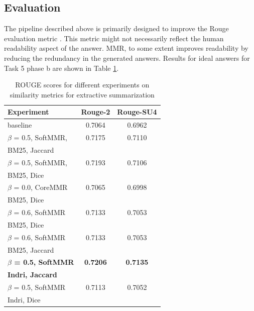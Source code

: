 \documentclass[11pt,a4paper]{article}
\begin{document}
\subsection{\textbf{Evaluation}} The pipeline described above is primarily designed to improve the Rouge evaluation metric \cite{Rougue}. This metric might not necessarily reflect the human readability aspect of the answer. MMR, to some extent improves readability by reducing the redundancy in the generated answers.
Results for ideal answers for Task 5 phase b are shown in Table \ref{tab:rouge_extractive_summarization}.

\begin{table}[t!]
    \centering
    \begin{tabular}{|l|c|c|}
         \hline
            Experiment & Rouge-2 & Rouge-SU4 \\
        \hline
        \hline
        baseline & 0.7064 & 0.6962 \\
        \hline
        $\beta$ = 0.5, SoftMMR,  & 0.7175 & 0.7110  \\ 
        BM25, Jaccard&&\\
        \hline
        $\beta$ = 0.5, SoftMMR, & 0.7193 & 0.7106  \\ 
        BM25, Dice&&\\
        \hline
        $\beta$ = 0.0, CoreMMR & 0.7065 & 0.6998  \\ 
        BM25, Dice&&\\
        \hline
        $\beta$ = 0.6, SoftMMR & 0.7133 & 0.7053  \\ 
        BM25, Dice&&\\
        \hline
        $\beta$ = 0.6, SoftMMR & 0.7133 & 0.7053  \\
        BM25, Jaccard&&\\
        \hline
        \textbf{$\beta$ = 0.5, SoftMMR} & \textbf{0.7206} & \textbf{0.7135}  \\ 
        \textbf{ Indri, Jaccard}&&\\
        \hline
        $\beta$ = 0.5, SoftMMR & 0.7113 & 0.7052  \\ 
        Indri, Dice&&\\
        \hline
    \end{tabular}
    \caption{ROUGE scores for different experiments on similarity metrics for extractive summarization}
    \label{tab:rouge_extractive_summarization}
\end{table}
\end{document}
